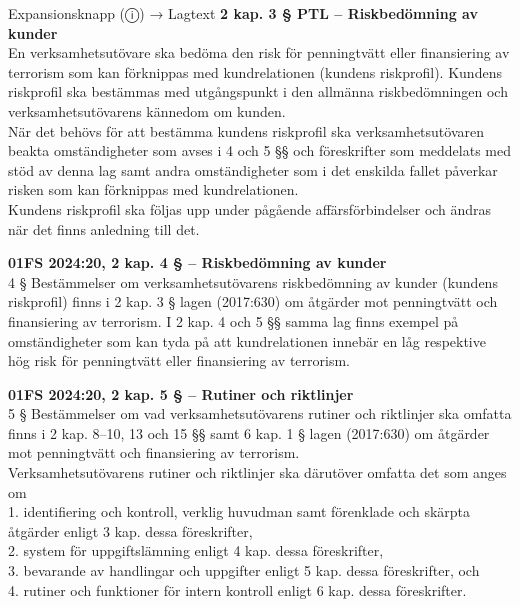 \documentclass[10pt]{beamer}
\begin{document}
\begin{frame}[label=riskfragor-steg1]
\begin{alertblock}{Expansionsknapp (ⓘ) → Lagtext}
    \tiny \textbf{2 kap. 3 § PTL – Riskbedömning av kunder}\\
    \tiny En verksamhetsutövare ska bedöma den risk för penningtvätt eller finansiering av 
    terrorism som kan förknippas med kundrelationen (kundens riskprofil). 
    Kundens riskprofil ska bestämmas med utgångspunkt i den allmänna riskbedömningen och 
    verksamhetsutövarens kännedom om kunden.\\

    \tiny När det behövs för att bestämma kundens riskprofil ska verksamhetsutövaren beakta 
    omständigheter som avses i 4 och 5 §§ och föreskrifter som meddelats med stöd av denna lag 
    samt andra omständigheter som i det enskilda fallet påverkar risken som kan 
    förknippas med kundrelationen.\\

    \tiny Kundens riskprofil ska följas upp under pågående affärsförbindelser och ändras 
    när det finns anledning till det.\\
    \vspace{0.1cm}

    \tiny \textbf{01FS 2024:20, 2 kap. 4 § – Riskbedömning av kunder}\\
    \tiny 4 § Bestämmelser om verksamhetsutövarens riskbedömning av kunder (kundens riskprofil) finns i 
     2 kap. 3 § lagen (2017:630) om åtgärder mot penningtvätt och finansiering av terrorism. 
    I 2 kap. 4 och 5 §§ samma lag finns exempel på omständigheter som kan tyda på att kundrelationen 
    innebär en låg respektive hög risk för penningtvätt eller finansiering av terrorism.
    \vspace{0.1cm}

    \tiny \textbf{01FS 2024:20, 2 kap. 5 § – Rutiner och riktlinjer}\\
    \tiny 5 § Bestämmelser om vad verksamhetsutövarens rutiner och riktlinjer ska omfatta finns i 
    2 kap. 8–10, 13 och 15 §§ samt 6 kap. 1 § lagen (2017:630) om åtgärder mot penningtvätt och 
    finansiering av terrorism.\\

    \tiny Verksamhetsutövarens rutiner och riktlinjer ska därutöver omfatta det som anges om\\

    \tiny 1. identifiering och kontroll, verklig huvudman samt förenklade och skärpta åtgärder enligt 
    3 kap. dessa föreskrifter,\\
    \tiny 2. system för uppgiftslämning enligt 4 kap. dessa föreskrifter,\\
    \tiny 3. bevarande av handlingar och uppgifter enligt 5 kap. dessa föreskrifter, och\\
    \tiny 4. rutiner och funktioner för intern kontroll enligt 6 kap. dessa föreskrifter.\\
    \vspace{0.1cm}


\end{alertblock}
\end{frame}
\end{document}
